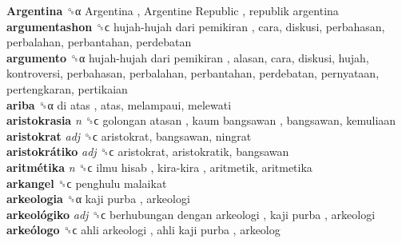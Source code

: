 \textbf{Argentina} ␝α   Argentina ,  Argentine Republic ,  republik argentina   \\
\textbf{argumentashon} ␝ϲ   hujah-hujah dari pemikiran , cara, diskusi, perbahasan, perbalahan, perbantahan, perdebatan  \\
\textbf{argumento} ␝α   hujah-hujah dari pemikiran , alasan, cara, diskusi, hujah, kontroversi, perbahasan, perbalahan, perbantahan, perdebatan, pernyataan, pertengkaran, pertikaian  \\
\textbf{ariba} ␝α   di atas , atas, melampaui, melewati  \\
\textbf{aristokrasia} \emph{n}  ␝ϲ   golongan atasan ,  kaum bangsawan , bangsawan, kemuliaan  \\
\textbf{aristokrat} \emph{adj}  ␝ϲ  aristokrat, bangsawan, ningrat  \\
\textbf{aristokrátiko} \emph{adj}  ␝ϲ  aristokrat, aristokratik, bangsawan  \\
\textbf{aritmétika} \emph{n}  ␝ϲ   ilmu hisab ,  kira-kira , aritmetik, aritmetika  \\
\textbf{arkangel} ␝ϲ   penghulu malaikat   \\
\textbf{arkeologia} ␝α   kaji purba , arkeologi  \\
\textbf{arkeológiko} \emph{adj}  ␝ϲ   berhubungan dengan arkeologi ,  kaji purba , arkeologi  \\
\textbf{arkeólogo} ␝ϲ   ahli arkeologi ,  ahli kaji purba , arkeolog  \\
